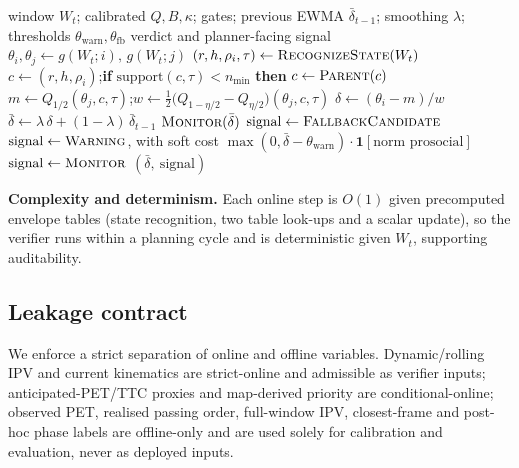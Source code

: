 \documentclass[12pt,a4paper]{article}
\begin{document}
\begin{algorithm}[t]
\caption{Online social-compliance verification step at time $t$}
\label{alg:online}
\begin{algorithmic}[1]
\REQUIRE window $W_t$; calibrated $Q,B,\kappa$; gates; previous EWMA $\bar\delta_{t-1}$;
         smoothing $\lambda$; thresholds $\theta_{\mathrm{warn}},\theta_{\mathrm{fb}}$
\ENSURE verdict and planner-facing signal
\STATE $\theta_i,\theta_j\leftarrow g(W_t;i),\,g(W_t;j)$ 
\STATE $(r,h,\rho_i,\tau)\leftarrow \textsc{RecognizeState}(W_t)$
\STATE $c\leftarrow(r,h,\rho_i)$;\quad \textbf{if} $\mathrm{support}(c,\tau)<n_{\min}$ \textbf{then} $c\leftarrow\textsc{Parent}(c)$
\STATE $m\leftarrow Q_{1/2}(\theta_j,c,\tau)$;\quad $w\leftarrow\tfrac12\bigl(Q_{1-\eta/2}-Q_{\eta/2}\bigr)(\theta_j,c,\tau)$
\STATE $\delta\leftarrow (\theta_i-m)/w$ 
\STATE $\bar\delta\leftarrow \lambda\,\delta+(1-\lambda)\,\bar\delta_{t-1}$ 
    \RETURN $\textsc{Monitor}(\bar\delta)$ 
\ENDIF
{}
    \STATE $\text{signal}\leftarrow\textsc{FallbackCandidate}$
    \STATE $\text{signal}\leftarrow\textsc{Warning}$, with soft cost $\max(0,\bar\delta-\theta_{\mathrm{warn}})\cdot\mathbf{1}[\text{norm prosocial}]$
\ELSE
    \STATE $\text{signal}\leftarrow\textsc{Monitor}$
\ENDIF
\RETURN $(\bar\delta,\ \text{signal})$
\end{algorithmic}
\end{algorithm}

\noindent\textbf{Complexity and determinism.} Each online step is $O(1)$ given precomputed
envelope tables (state recognition, two table look-ups and a scalar update), so the verifier
runs within a planning cycle and is deterministic given $W_t$, supporting auditability.

\subsection{Leakage contract}
We enforce a strict separation of online and offline variables. Dynamic/rolling IPV and
current kinematics are strict-online and admissible as verifier inputs; anticipated-PET/TTC
proxies and map-derived priority are conditional-online; observed PET, realised passing
order, full-window IPV, closest-frame and post-hoc phase labels are offline-only and are
used solely for calibration and evaluation, never as deployed inputs.
\end{document}
